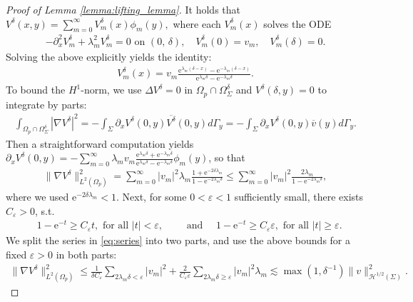 \documentclass[report]{elsarticle}
\numberwithin{theorem}{section}
\newcommand{\re}{\varepsilon}
\begin{document}
\begin{proof}[Proof of Lemma \ref{lemma:lifting_lemma}]
It holds that $
	V^{\delta}(x,y)=\sum\limits_{m=0}^{\infty}V^{\delta}_m(x)\phi_m(y), $
	where each $V^{\delta}_m(x)$ solves the ODE
	\begin{align*}
		-\partial_x^2 V^{\delta}_m+\lambda_m^2 V^{\delta}_m=0 \text{ on }(0,\,\delta), \quad 
		V^{\delta}_m(0)=v_m, \quad V^{\delta}_m(\delta)=0.
	\end{align*}
	Solving the above explicitly yields the identity:
	\begin{align*}
		V_m^{\delta}(x)=v_m\frac{\mathrm{e}^{\lambda_m(\delta-x)}-\mathrm{e}^{-\lambda_m(\delta-x)}}{\mathrm{e}^{\lambda_m\delta}-\mathrm{e}^{-\lambda_m\delta}}.
	\end{align*}
To bound the $H^1$-norm, we use $\Delta V^{\delta}=0$ in $\Omega_p\cap\Omega_{\Sigma}^{\delta}$ and $V^{\delta}(\delta,y)=0$ to integrate by parts:
	\begin{align*}
		\int_{\Omega_p\cap\Omega_{\Sigma}^{\delta}}|\nabla V^{\delta}|^2=-\int_{\Sigma}\partial_x V^{\delta}(0,y)\overline{V^{\delta}}(0,y)d\Gamma_y=-\int_{\Sigma}\partial_x V^{\delta}(0,y)\overline{v}(y)d\Gamma_y. 
	\end{align*}
	Then a straightforward computation yields $\partial_x V^{\delta}(0,y)=-\sum\limits_{m=0}^{\infty}\lambda_mv_m\frac{\mathrm{e}^{\lambda_m\delta}+\mathrm{e}^{-\lambda_m\delta}}{\mathrm{e}^{\lambda_m\delta}-\mathrm{e}^{-\lambda_m\delta}}\phi_m(y)$, so that 
	\begin{align}
		\label{eq:series}
		\|\nabla V^{\delta}\|^2_{L^2(\Omega_p)}=\sum\limits_{m=0}^{\infty}|v_m|^2\lambda_m\frac{1+\mathrm{e}^{-2\delta\lambda_m}}{1-\mathrm{e}^{-2\lambda_m\delta}}\leq \sum\limits_{m=0}^{\infty}|v_m|^2\frac{2\lambda_m}{1-\mathrm{e}^{-2\lambda_m\delta}},
	\end{align}
where we used $\mathrm{e}^{-2\delta\lambda_m}<1$. Next, 
for some $0<\re<1$ sufficiently small, there exists $C_{\re}>0$, s.t.
	\begin{align*}
		&1-\mathrm{e}^{-t}\geq C_{\re}t, \text{ for all }|t|<\re,\qquad \text{ and }\quad 
		1-\mathrm{e}^{-t}\geq C_{\re}\re, \text{ for all }|t|\geq \re.
	\end{align*}
We split the series in \eqref{eq:series} into two parts, and use the above bounds for a fixed $\re>0$ in both parts:
	\begin{align}
		\label{eq:final1}
		\|\nabla V^{\delta}\|^2_{L^2(\Omega_p)}\leq  \frac{1}{\delta C_{\re}}\sum\limits_{2\lambda_m\delta<\re}|v_m|^2+\frac{2}{C_{\re}\re}\sum\limits_{2\lambda_m\delta\geq \re}|v_m|^2\lambda_m\lesssim \max(1,\delta^{-1})\|v\|^2_{\mathcal{H}^{1/2}(\Sigma)}.

\end{align}
\end{proof}
\end{document}
